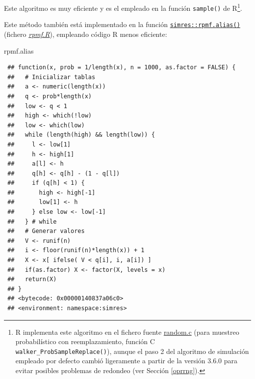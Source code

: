 \documentclass[
]{book}
\newenvironment{Shaded}{\begin{snugshade}}{\end{snugshade}}
\newcommand{\NormalTok}[1]{#1}
\theoremstyle{break}
\theoremstyle{nonumberplain}
\begin{document}
Este algoritmo es muy eficiente y es el empleado en la función \texttt{sample()} de R\footnote{R implementa este algoritmo en el fichero fuente \href{https://svn.r-project.org/R/trunk/src/main/random.c}{random.c} (para muestreo probabilístico con reemplazamiento, función C \texttt{walker\_ProbSampleReplace()}), aunque el paso 2 del algoritmo de simulación empleado por defecto cambió ligeramente a partir de la versión 3.6.0 para evitar posibles problemas de redondeo (ver Sección \ref{oprrng}).}.

Este método también está implementado en la función \href{https://rubenfcasal.github.io/simres/reference/rpmf.alias.html}{\texttt{simres::rpmf.alias()}} (fichero \href{R/rpmf.R}{\emph{rpmf.R}}), empleando código R menos eficiente:

\begin{Shaded}
\begin{Highlighting}[]
\NormalTok{rpmf.alias}
\end{Highlighting}
\end{Shaded}

\begin{verbatim}
 ## function(x, prob = 1/length(x), n = 1000, as.factor = FALSE) {
 ##   # Inicializar tablas
 ##   a <- numeric(length(x))
 ##   q <- prob*length(x)
 ##   low <- q < 1
 ##   high <- which(!low)
 ##   low <- which(low)
 ##   while (length(high) && length(low)) {
 ##     l <- low[1]
 ##     h <- high[1]
 ##     a[l] <- h
 ##     q[h] <- q[h] - (1 - q[l])
 ##     if (q[h] < 1) {
 ##       high <- high[-1]
 ##       low[1] <- h
 ##     } else low <- low[-1]
 ##   } # while
 ##   # Generar valores
 ##   V <- runif(n)
 ##   i <- floor(runif(n)*length(x)) + 1
 ##   X <- x[ ifelse( V < q[i], i, a[i]) ]
 ##   if(as.factor) X <- factor(X, levels = x)
 ##   return(X)
 ## }
 ## <bytecode: 0x00000140837a06c0>
 ## <environment: namespace:simres>
\end{verbatim}
\end{document}
